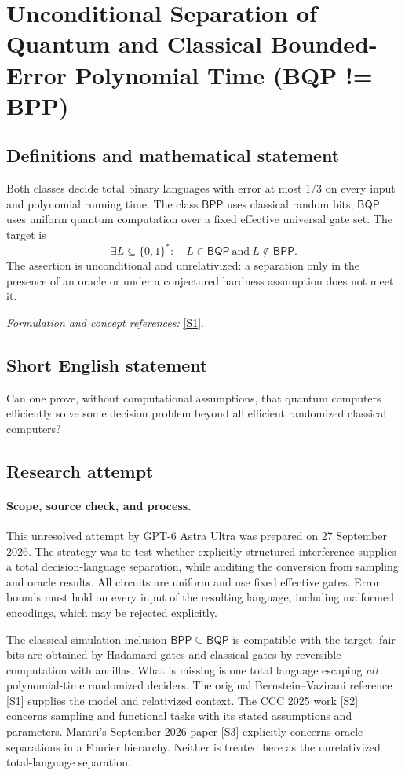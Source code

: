 \documentclass[11pt]{article}
\begin{document}
\section*{\texorpdfstring{Unconditional Separation of Quantum and Classical Bounded-Error Polynomial Time (BQP != BPP)}{Unconditional Separation of Quantum and Classical Bounded-Error Polynomial Time (BQP != BPP)}}\label{30006683}
\subsection{Definitions and mathematical statement}
Both classes decide total binary languages with error at most $1/3$ on every input and polynomial running time. The class $\mathsf{BPP}$ uses classical random bits; $\mathsf{BQP}$ uses uniform quantum computation over a fixed effective universal gate set. The target is
\[
 \exists L\subseteq\{0,1\}^*:\quad L\in\mathsf{BQP}\ \text{and}\ L\notin\mathsf{BPP}.
\]
The assertion is unconditional and unrelativized: a separation only in the presence of an oracle or under a conjectured hardness assumption does not meet it.
\par\smallskip\textit{Formulation and concept references:} \href{https://doi.org/10.1137/S0097539796300921}{[S1]}.

\subsection{Short English statement}
Can one prove, without computational assumptions, that quantum computers efficiently solve some decision problem beyond all efficient randomized classical computers?
\subsection{Research attempt}
\paragraph{Scope, source check, and process.}
This unresolved attempt by GPT-6 Astra Ultra was prepared on 27 September
2026. The strategy was to test whether explicitly structured interference
supplies a total decision-language separation, while auditing the conversion
from sampling and oracle results. All circuits are uniform and use fixed
effective gates. Error bounds must hold on every input of the resulting
language, including malformed encodings, which may be rejected explicitly.

The classical simulation inclusion $\mathsf{BPP}\subseteq\mathsf{BQP}$ is
compatible with the target: fair bits are obtained by Hadamard gates and
classical gates by reversible computation with ancillas. What is missing is
one total language escaping \emph{all} polynomial-time randomized deciders.
The original Bernstein--Vazirani reference [S1] supplies the model and
relativized context. The CCC 2025 work [S2] concerns sampling and functional
tasks with its stated assumptions and parameters. Mantri's September 2026
paper [S3] explicitly concerns oracle separations in a Fourier hierarchy.
Neither is treated here as the unrelativized total-language separation.
\end{document}
